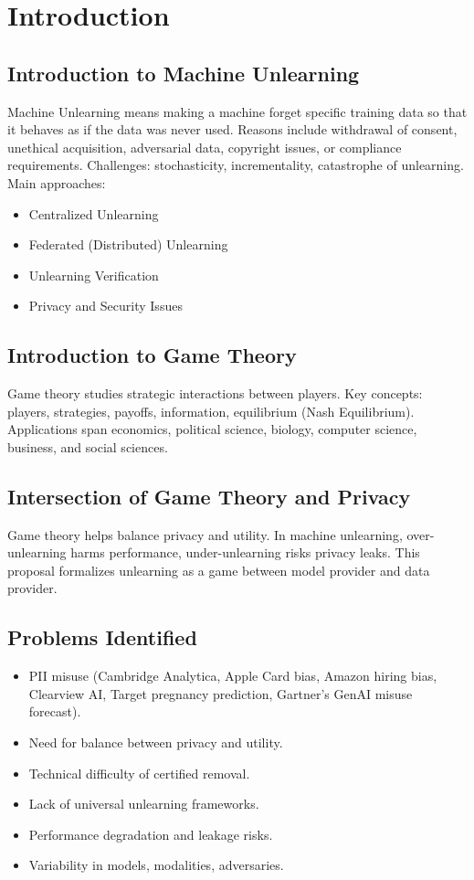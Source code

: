 \documentclass[12pt,a4paper]{report}
\begin{document}
\chapter{Introduction}
\section{Introduction to Machine Unlearning}
Machine Unlearning means making a machine forget specific training data so that it behaves as if the data was never used. Reasons include withdrawal of consent, unethical acquisition, adversarial data, copyright issues, or compliance requirements.  
Challenges: stochasticity, incrementality, catastrophe of unlearning.  
Main approaches:
\begin{itemize}
    \item Centralized Unlearning
    \item Federated (Distributed) Unlearning
    \item Unlearning Verification
    \item Privacy and Security Issues
\end{itemize}

\section{Introduction to Game Theory}
Game theory studies strategic interactions between players.  
Key concepts: players, strategies, payoffs, information, equilibrium (Nash Equilibrium).  
Applications span economics, political science, biology, computer science, business, and social sciences.

\section{Intersection of Game Theory and Privacy}
Game theory helps balance privacy and utility. In machine unlearning, over-unlearning harms performance, under-unlearning risks privacy leaks.  
This proposal formalizes unlearning as a game between model provider and data provider.

\section{Problems Identified}
\begin{itemize}
    \item PII misuse (Cambridge Analytica, Apple Card bias, Amazon hiring bias, Clearview AI, Target pregnancy prediction, Gartner’s GenAI misuse forecast).
    \item Need for balance between privacy and utility.
    \item Technical difficulty of certified removal.
    \item Lack of universal unlearning frameworks.
    \item Performance degradation and leakage risks.
    \item Variability in models, modalities, adversaries.
\end{itemize}
\end{document}
